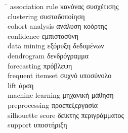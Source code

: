 
\begin{tabbing}
  \hspace{6.5cm}\= \kill
  \textenglish{association rule}     \> κανόνας συσχέτισης \\
  \textenglish{clustering}           \> συσταδοποίηση \\
  \textenglish{cohort analysis}      \> ανάλυση κοόρτης \\
  \textenglish{confidence}           \> εμπιστοσύνη \\
  \textenglish{data mining}          \> εξόρυξη δεδομένων \\
  \textenglish{dendrogram}           \> δενδρόγραμμα \\
  \textenglish{forecasting}          \> πρόβλεψη \\
  \textenglish{frequent itemset}     \> συχνό υποσύνολο \\
  \textenglish{lift}                 \> άρση \\
  \textenglish{machine learning}     \> μηχανική μάθηση \\
  \textenglish{preprocessing}        \> προεπεξεργασία \\
  \textenglish{silhouette score}     \> δείκτης περιγράμματος \\
  \textenglish{support}              \> υποστήριξη \\
\end{tabbing}

\clearpage
